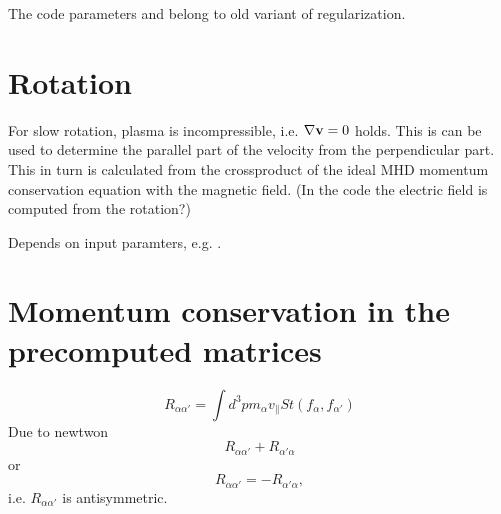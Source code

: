 The code parameters  and
 belong to old variant of
regularization.

\section{Rotation}

For slow rotation, plasma is incompressible, i.e. $\nabla {\bf v} = 0$
holds. This is can be used to determine the parallel part of the
velocity from the perpendicular part. This in turn is calculated from
the crossproduct of the ideal MHD momentum conservation equation with
the magnetic field.
(In the code the electric field is computed from the rotation?)

Depends on input paramters, e.g. .

\section{Momentum conservation in the precomputed matrices}
\begin{equation}
  R_{\alpha\alpha'} = \int d^3p m_{\alpha} v_{\parallel} St(f_{\alpha}, f_{\alpha'})
\end{equation}
Due to newtwon
\begin{equation}
  R_{\alpha\alpha'} + R_{\alpha'\alpha}
\end{equation}
or
\begin{equation}
  R_{\alpha\alpha'} = - R_{\alpha'\alpha},
\end{equation}
i.e. $R_{\alpha\alpha'}$ is antisymmetric.

